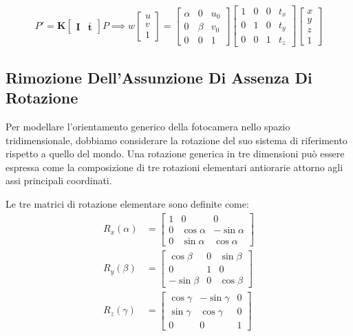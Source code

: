 ﻿\documentclass[11pt, a4paper]{article}
\begin{document}
\begin{equation}
P' = \bm{K} \begin{bmatrix} \bm{I} & \bar{\bm{t}} \end{bmatrix} P \implies w \begin{bmatrix} u \\ v \\ 1 \end{bmatrix} = \begin{bmatrix} \alpha & 0 & u_0 \\ 0 & \beta & v_0 \\ 0 & 0 & 1 \end{bmatrix} \begin{bmatrix} 1 & 0 & 0 & t_x \\ 0 & 1 & 0 & t_y \\ 0 & 0 & 1 & t_z \end{bmatrix} \begin{bmatrix} x \\ y \\ z \\ 1 \end{bmatrix}
\end{equation}



\subsection{Rimozione Dell'Assunzione Di Assenza Di Rotazione}

Per modellare l'orientamento generico della fotocamera nello spazio tridimensionale, dobbiamo considerare la rotazione del suo sistema di riferimento rispetto a quello del mondo. Una rotazione generica in tre dimensioni può essere espressa come la composizione di tre rotazioni elementari antiorarie attorno agli assi principali coordinati.


Le tre matrici di rotazione elementare sono definite come:
\begin{align*}
R_x(\alpha) &= \begin{bmatrix} 1 & 0 & 0 \\ 0 & \cos\alpha & -\sin\alpha \\ 0 & \sin\alpha & \cos\alpha \end{bmatrix} \\
R_y(\beta) &= \begin{bmatrix} \cos\beta & 0 & \sin\beta \\ 0 & 1 & 0 \\ -\sin\beta & 0 & \cos\beta \end{bmatrix} \\
R_z(\gamma) &= \begin{bmatrix} \cos\gamma & -\sin\gamma & 0 \\ \sin\gamma & \cos\gamma & 0 \\ 0 & 0 & 1 \end{bmatrix}
\end{align*}
\end{document}

